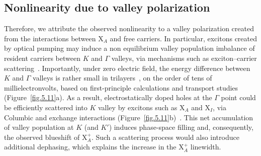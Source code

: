 \subsection{Nonlinearity due to valley polarization}
Therefore, we attribute the observed nonlinearity to a valley polarization created from the interactions between X$_A$ and free carriers. 
In particular, excitons created by optical pumping may induce a non equilibrium valley population imbalance of resident carriers between $K$ and $\Gamma$ valleys, via mechanisms such as exciton--carrier scattering~\cite{Courtade2017-cf,Fey2020-yf}. 
Importantly, under zero electric field, the energy difference between $K$ and $\Gamma$ valleys is rather small in trilayers~\cite{Movva2018-mu}, on the order of tens of millielectronvolts, based on first-principle calculations and transport studies (Figure~\ref{fig.5.11}a). 
As a result, electrostatically doped holes at the $\Gamma$ point could be efficiently scattered into $K$ valley by excitons such as X$_A$ and X$_I$, 
via Columbic and exchange interactions (Figure~\ref{fig.5.11}b)~\cite{Courtade2017-cf,Fey2020-yf}.
This net accumulation of valley population at $K$ (and $K'$) induces phase-space filling and, consequently, the observed blueshift of X$_A^+$. 
Such a scattering process would also introduce additional dephasing, which explains the increase in the X$_A^+$ linewidth.

